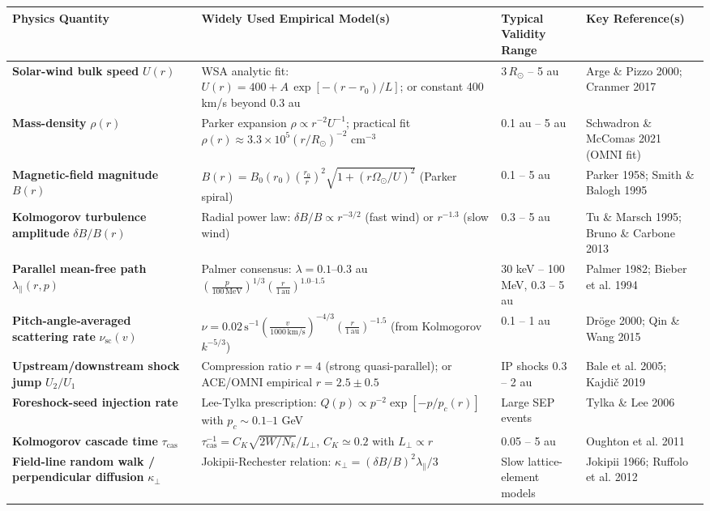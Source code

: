 \begin{center}
\begin{tabular}{@{}p{4.2cm}p{6.5cm}p{3.2cm}p{3.6cm}@{}}
\toprule
\textbf{Physics Quantity} & \textbf{Widely Used Empirical Model(s)} & \textbf{Typical Validity Range} & \textbf{Key Reference(s)} \\
\midrule
\textbf{Solar-wind bulk speed} $U(r)$ & WSA analytic fit: $U(r) = 400 + A\,\exp\left[-(r - r_0)/L\right]$; or constant 400 km/s beyond 0.3 au & $3\,R_\odot$ – 5 au & Arge \& Pizzo 2000; Cranmer 2017 \\
\midrule
\textbf{Mass-density} $\rho(r)$ & Parker expansion $\rho \propto r^{-2} U^{-1}$; practical fit $\rho(r) \approx 3.3 \times 10^5 (r/R_\odot)^{-2}$ cm$^{-3}$ & 0.1 au – 5 au & Schwadron \& McComas 2021 (OMNI fit) \\
\midrule
\textbf{Magnetic-field magnitude} $B(r)$ & $B(r) = B_0(r_0) \left( \frac{r_0}{r} \right)^2 \sqrt{1 + (r\Omega_\odot/U)^2}$ (Parker spiral) & 0.1 – 5 au & Parker 1958; Smith \& Balogh 1995 \\
\midrule
\textbf{Kolmogorov turbulence amplitude} $\delta B/B(r)$ & Radial power law: $\delta B/B \propto r^{-3/2}$ (fast wind) or $r^{-1.3}$ (slow wind) & 0.3 – 5 au & Tu \& Marsch 1995; Bruno \& Carbone 2013 \\
\midrule
\textbf{Parallel mean-free path} $\lambda_\parallel(r, p)$ & Palmer consensus: $\lambda = 0.1$–$0.3$ au $\left(\frac{p}{100\,\mathrm{MeV}}\right)^{1/3} \left(\frac{r}{1\,\mathrm{au}}\right)^{1.0\text{–}1.5}$ & 30 keV – 100 MeV, 0.3 – 5 au & Palmer 1982; Bieber et al. 1994 \\
\midrule
\textbf{Pitch-angle-averaged scattering rate} $\nu_{\text{sc}}(v)$ & $\nu = 0.02\,\mathrm{s}^{-1} \left(\frac{v}{1000\,\mathrm{km/s}}\right)^{-4/3} \left(\frac{r}{1\,\mathrm{au}}\right)^{-1.5}$ (from Kolmogorov $k^{-5/3}$) & 0.1 – 1 au & Dröge 2000; Qin \& Wang 2015 \\
\midrule
\textbf{Upstream/downstream shock jump} $U_2/U_1$ & Compression ratio $r = 4$ (strong quasi-parallel); or ACE/OMNI empirical $r = 2.5 \pm 0.5$ & IP shocks 0.3 – 2 au & Bale et al. 2005; Kajdič 2019 \\
\midrule
\textbf{Foreshock-seed injection rate} & Lee-Tylka prescription: $Q(p) \propto p^{-2} \exp\left[-p/p_c(r)\right]$ with $p_c \sim 0.1$–$1$ GeV & Large SEP events & Tylka \& Lee 2006 \\
\midrule
\textbf{Kolmogorov cascade time} $\tau_{\text{cas}}$ & $\tau_{\text{cas}}^{-1} = C_K \sqrt{2W/N_k}/L_\perp$, $C_K \simeq 0.2$ with $L_\perp \propto r$ & 0.05 – 5 au & Oughton et al. 2011 \\
\midrule
\textbf{Field-line random walk / perpendicular diffusion} $\kappa_\perp$ & Jokipii-Rechester relation: $\kappa_\perp = (\delta B/B)^2 \lambda_\parallel/3$ & Slow lattice-element models & Jokipii 1966; Ruffolo et al. 2012 \\
\bottomrule
\end{tabular}
\end{center}

